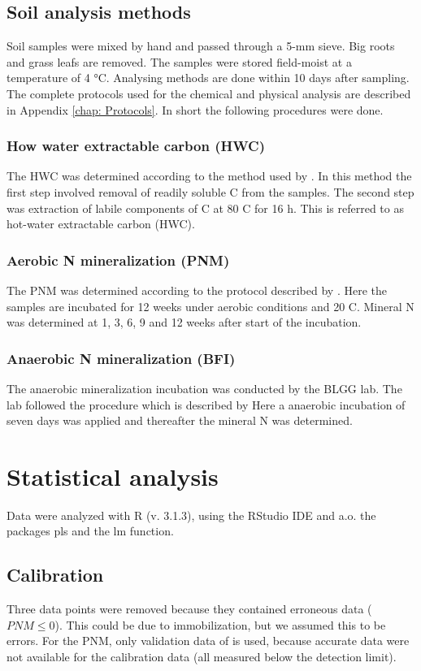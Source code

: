 \documentclass[10pt,twoside,dutch,english]{report}
\begin{document}
\subsection{Soil analysis methods}
Soil samples were mixed by hand and passed through a 5-mm sieve. Big roots and grass leafs are removed. The samples were stored field-moist at a temperature of 4 °C. Analysing methods are done within 10 days after sampling. 
The complete protocols used for the chemical and physical analysis are described in Appendix \ref{chap: Protocols}. In short the following procedures were done. 

\subsubsection{How water extractable carbon (HWC)}
The HWC was determined according to the method used by \citet{Ghani2003}. In this method the first step involved removal of readily soluble C from the samples. The second step was extraction of labile components of C at 80 \degree C for 16 h. This is referred to as hot-water extractable carbon (HWC).

\subsubsection{Aerobic N mineralization (PNM)}
The PNM was determined according to the protocol described by \citet{Ros2014}. Here the samples are incubated for 12 weeks under aerobic conditions and 20 \degree C. Mineral N was determined at 1, 3, 6, 9 and 12 weeks after start of the incubation. 

\subsubsection{Anaerobic N mineralization (BFI)}
The anaerobic mineralization incubation was conducted by the BLGG lab. The lab followed the procedure which is described by \citet{Hanegraaf2008} Here a anaerobic incubation of seven days was applied and thereafter the mineral N was determined. 



\section{Statistical analysis}
Data were analyzed with R (v. 3.1.3), using the RStudio IDE and a.o. the packages pls and the lm function. 
\subsection{Calibration}
Three data points were removed because they contained erroneous data ($PNM\leq 0$). This could be due to immobilization, but we assumed this to be errors. For the PNM, only validation data of  is used, because accurate  data were not available for the calibration data (all measured below  the detection limit). 
\end{document}
